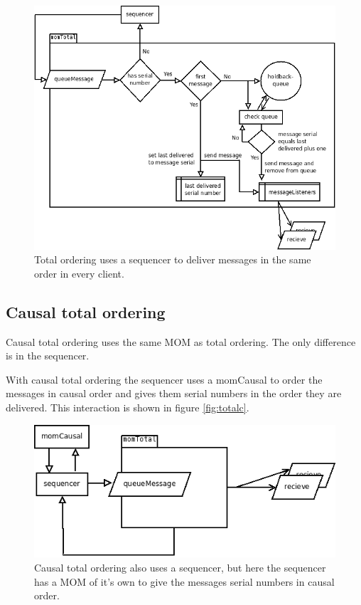 \documentclass[a4paper,english]{article}
\begin{document}
\begin{figure}
\includegraphics[width=\textwidth]{momTotal.png}
\caption{Total ordering uses a sequencer to deliver messages in the same order in every client.}
\label{fig:total}
\end{figure}

\subsection{Causal total ordering}
Causal total ordering uses the same MOM as total ordering. The only difference is in the sequencer.

With causal total ordering the sequencer uses a momCausal to order the messages in causal order and gives them serial numbers in the order they are delivered. This interaction is shown in figure \vref{fig:totalc}.

\begin{figure}
\includegraphics[width=\textwidth]{momTotalC.png}
\caption{Causal total ordering also uses a sequencer, but here the sequencer has a MOM of it's own to give the messages serial numbers in causal order.}
\label{fig:totalc}
\end{figure}
\end{document}
